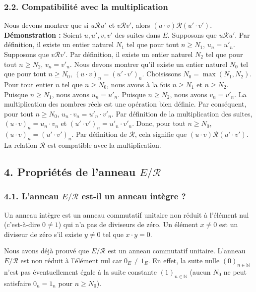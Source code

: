 \documentclass{report}
\begin{document}
\subsubsection*{2.2. Compatibilité avec la multiplication}
Nous devons montrer que si $u \mathcal{R} u'$ et $v \mathcal{R} v'$, alors $(u \cdot v) \mathcal{R} (u' \cdot v')$.
\textbf{Démonstration :}
Soient $u, u', v, v'$ des suites dans $E$.
Supposons que $u \mathcal{R} u'$. Par définition, il existe un entier naturel $N_1$ tel que pour tout $n \ge N_1$, $u_n = u'_n$.
Supposons que $v \mathcal{R} v'$. Par définition, il existe un entier naturel $N_2$ tel que pour tout $n \ge N_2$, $v_n = v'_n$.
Nous devons montrer qu'il existe un entier naturel $N_0$ tel que pour tout $n \ge N_0$, $(u \cdot v)_n = (u' \cdot v')_n$.
Choisissons $N_0 = \max(N_1, N_2)$.
Pour tout entier $n$ tel que $n \ge N_0$, nous avons à la fois $n \ge N_1$ et $n \ge N_2$.
Puisque $n \ge N_1$, nous avons $u_n = u'_n$.
Puisque $n \ge N_2$, nous avons $v_n = v'_n$.
La multiplication des nombres réels est une opération bien définie. Par conséquent, pour tout $n \ge N_0$, $u_n \cdot v_n = u'_n \cdot v'_n$.
Par définition de la multiplication des suites, $(u \cdot v)_n = u_n \cdot v_n$ et $(u' \cdot v')_n = u'_n \cdot v'_n$.
Donc, pour tout $n \ge N_0$, $(u \cdot v)_n = (u' \cdot v')_n$.
Par définition de $\mathcal{R}$, cela signifie que $(u \cdot v) \mathcal{R} (u' \cdot v')$.
La relation $\mathcal{R}$ est compatible avec la multiplication.



\subsection*{4. Propriétés de l'anneau $E/\mathcal{R}$}

\subsubsection*{4.1. L'anneau $E/\mathcal{R}$ est-il un anneau intègre ?}

Un anneau intègre est un anneau commutatif unitaire non réduit à l'élément nul (c'est-à-dire $0 \neq 1$) qui n'a pas de diviseurs de zéro. Un élément $x \neq 0$ est un diviseur de zéro s'il existe $y \neq 0$ tel que $x \cdot y = 0$.

Nous avons déjà prouvé que $E/\mathcal{R}$ est un anneau commutatif unitaire.
L'anneau $E/\mathcal{R}$ est non réduit à l'élément nul car $\overline{0_E} \neq \overline{1_E}$. En effet, la suite nulle $(0)_{n \in \mathbb{N}}$ n'est pas éventuellement égale à la suite constante $(1)_{n \in \mathbb{N}}$ (aucun $N_0$ ne peut satisfaire $0_n = 1_n$ pour $n \ge N_0$).
\end{document}
